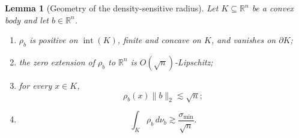 \documentclass[11pt]{article}
\newtheorem{lemma}[theorem]{Lemma}
\theoremstyle{definition}
\theoremstyle{remark}
\newcommand{\R}{\mathbb R}
\begin{document}
\begin{lemma}[Geometry of the density-sensitive radius]
\label{lem:log-affine-radius}
Let $K\subseteq\R^n$ be a convex body and let $b\in\R^n$. 
\begin{enumerate}[label=\textup{(\roman*)}]
\item $\rho_b$ is positive on $\operatorname{int}(K)$, finite and concave on
$K$, and vanishes on $\partial K$;
\item the zero extension of $\rho_b$ to $\R^n$ is $O(\sqrt n)$-Lipschitz;
\item for every $x\in K$,
\begin{equation}\label{eq:log-affine-score-radius}
 \rho_b(x)\|b\|_2\lesssim \sqrt n;
\end{equation}
\item 
\begin{equation}\label{eq:log-affine-mean-radius}
 \int_K\rho_b\,d\nu_b
 \gtrsim \frac{\sigma_{\min}}{\sqrt n}.
\end{equation}
\end{enumerate}
\end{lemma}
\end{document}
